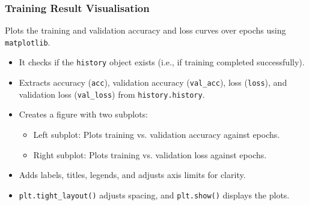 \subsubsection{Training Result Visualisation}
Plots the training and validation accuracy and loss curves over epochs using \verb|matplotlib|.
\begin{itemize}
    \item It checks if the \texttt{history} object exists (i.e., if training completed successfully).
    \item Extracts accuracy (\texttt{acc}), validation accuracy (\verb|val_acc|), loss (\texttt{loss}), and validation loss (\verb|val_loss|) from \texttt{history.history}.
    \item Creates a figure with two subplots:
    \begin{itemize}
        \item Left subplot: Plots training vs. validation accuracy against epochs.
        \item Right subplot: Plots training vs. validation loss against epochs.
    \end{itemize}
    \item Adds labels, titles, legends, and adjusts axis limits for clarity.
    \item \verb|plt.tight_layout()| adjusts spacing, and \texttt{plt.show()} displays the plots.
\end{itemize}

